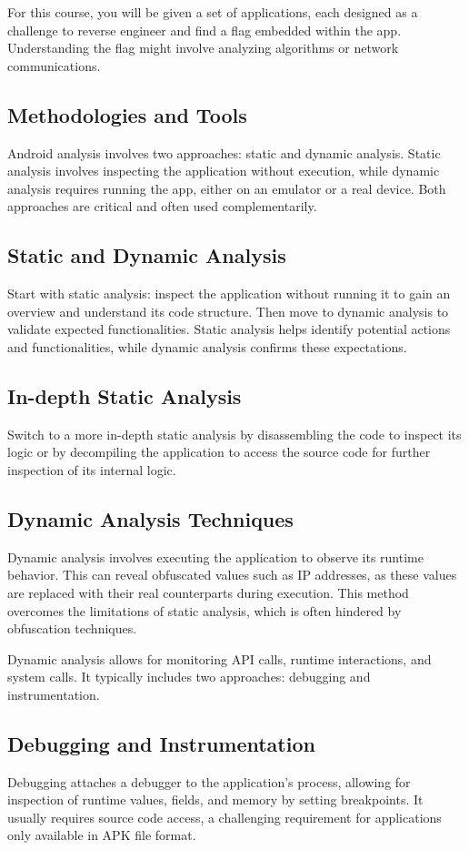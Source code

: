 \documentclass{article}
\begin{document}
For this course, you will be given a set of applications, each designed as a challenge to reverse engineer and find a flag embedded within the app. Understanding the flag might involve analyzing algorithms or network communications.

\subsection*{Methodologies and Tools}
Android analysis involves two approaches: static and dynamic analysis. Static analysis involves inspecting the application without execution, while dynamic analysis requires running the app, either on an emulator or a real device. Both approaches are critical and often used complementarily.

\subsection*{Static and Dynamic Analysis}
Start with static analysis: inspect the application without running it to gain an overview and understand its code structure. Then move to dynamic analysis to validate expected functionalities. Static analysis helps identify potential actions and functionalities, while dynamic analysis confirms these expectations.

\subsection*{In-depth Static Analysis}
Switch to a more in-depth static analysis by disassembling the code to inspect its logic or by decompiling the application to access the source code for further inspection of its internal logic.

\subsection*{Dynamic Analysis Techniques}
Dynamic analysis involves executing the application to observe its runtime behavior. This can reveal obfuscated values such as IP addresses, as these values are replaced with their real counterparts during execution. This method overcomes the limitations of static analysis, which is often hindered by obfuscation techniques.

Dynamic analysis allows for monitoring API calls, runtime interactions, and system calls. It typically includes two approaches: debugging and instrumentation.

\subsection*{Debugging and Instrumentation}
Debugging attaches a debugger to the application's process, allowing for inspection of runtime values, fields, and memory by setting breakpoints. It usually requires source code access, a challenging requirement for applications only available in APK file format.
\end{document}

